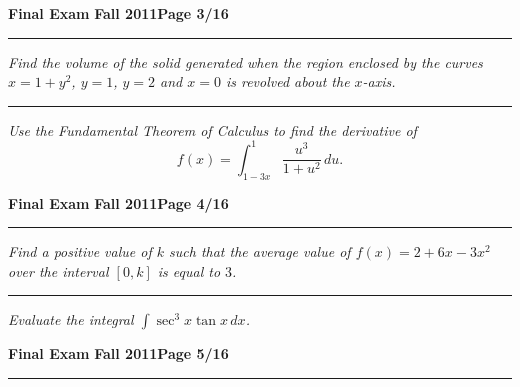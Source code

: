 \documentclass[12pt]{article}
\begin{document}
\hfill{\large\bf Final Exam}\hfill{\large\bf
  Fall 2011}\hfill{\large\bf Page 3/16}\hrule

\bigskip
{\problem[15 pts] \em Find the volume of the solid generated when the region
enclosed by the curves $x=1+y^2$, $y=1$, $y=2$ and $x=0$ is revolved about the
$x$-axis.}
\vspace{9.5cm}
\begin{flushright}
\end{flushright}
\hrule
{\problem[10 pts] \em Use the Fundamental Theorem of Calculus to find the derivative of
 \begin{equation*}
f(x) = \int_{1-3x}^1 \frac{u^3}{1+u^2}\, du.
\end{equation*}
\vspace{6.5cm}
\begin{flushright}
\end{flushright}
\newpage

\hfill{\large\bf Final Exam}\hfill{\large\bf
  Fall 2011}\hfill{\large\bf Page 4/16}\hrule

\bigskip
{\problem[15 pts] \em Find a positive value of $k$ such that the average value
of $f(x) = 2+6x-3x^2$ over the interval $[0,k]$ is equal to $3$.} 
\vspace{8cm}
\begin{flushright}
\end{flushright}
\hrule
{\problem[10 pts] \em Evaluate the integral $\displaystyle{\int \sec^3x \tan
x\, dx}$.} \newpage

\hfill{\large\bf Final Exam}\hfill{\large\bf
  Fall 2011}\hfill{\large\bf Page 5/16}\hrule

}
\end{document}

